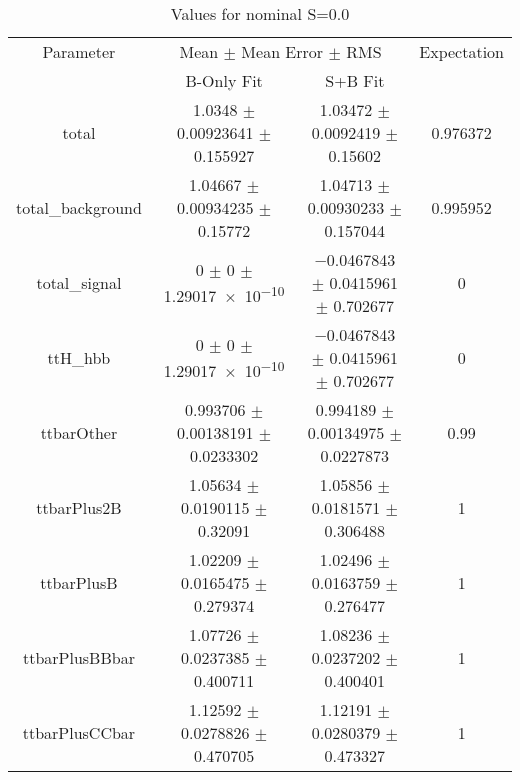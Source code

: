 \begin{table}
\centering
\caption{Values for nominal S=0.0}
\begin{tabular}{cccc}
\toprule
Parameter & \multicolumn{2}{c}{Mean $\pm$ Mean Error $\pm$ RMS} & Expectation\\
 & B-Only Fit & S+B Fit & \\
\midrule
total & \num{1.0348} $\pm$ \num{0.00923641} $\pm$ \num{0.155927} & \num{1.03472} $\pm$ \num{0.0092419} $\pm$ \num{0.15602} & \num{0.976372}\\
total\_background & \num{1.04667} $\pm$ \num{0.00934235} $\pm$ \num{0.15772} & \num{1.04713} $\pm$ \num{0.00930233} $\pm$ \num{0.157044} & \num{0.995952}\\
total\_signal & \num{0} $\pm$ \num{0} $\pm$ \num{1.29017e-10} & \num{-0.0467843} $\pm$ \num{0.0415961} $\pm$ \num{0.702677} & \num{0}\\
ttH\_hbb & \num{0} $\pm$ \num{0} $\pm$ \num{1.29017e-10} & \num{-0.0467843} $\pm$ \num{0.0415961} $\pm$ \num{0.702677} & \num{0}\\
ttbarOther & \num{0.993706} $\pm$ \num{0.00138191} $\pm$ \num{0.0233302} & \num{0.994189} $\pm$ \num{0.00134975} $\pm$ \num{0.0227873} & \num{0.99}\\
ttbarPlus2B & \num{1.05634} $\pm$ \num{0.0190115} $\pm$ \num{0.32091} & \num{1.05856} $\pm$ \num{0.0181571} $\pm$ \num{0.306488} & \num{1}\\
ttbarPlusB & \num{1.02209} $\pm$ \num{0.0165475} $\pm$ \num{0.279374} & \num{1.02496} $\pm$ \num{0.0163759} $\pm$ \num{0.276477} & \num{1}\\
ttbarPlusBBbar & \num{1.07726} $\pm$ \num{0.0237385} $\pm$ \num{0.400711} & \num{1.08236} $\pm$ \num{0.0237202} $\pm$ \num{0.400401} & \num{1}\\
ttbarPlusCCbar & \num{1.12592} $\pm$ \num{0.0278826} $\pm$ \num{0.470705} & \num{1.12191} $\pm$ \num{0.0280379} $\pm$ \num{0.473327} & \num{1}\\
\bottomrule
\end{tabular}
\end{table}